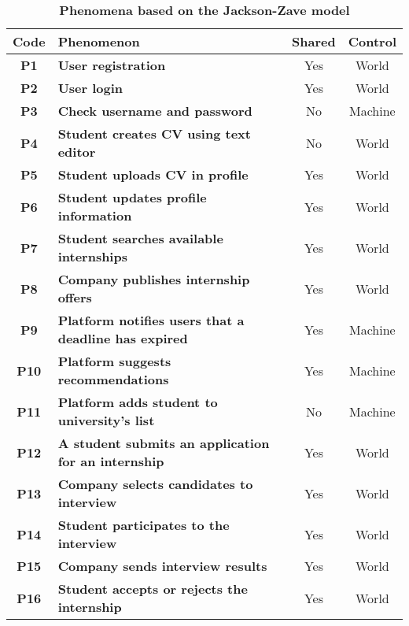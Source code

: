 \begin{table}[H]
    \caption*{\textbf{Phenomena based on the Jackson-Zave model}}
    \centering 
    \begin{tabular}{|c|p{24em}|c|c|}
    \hline
    \rowcolor{bluepoli!40} %
    \small\textbf{Code} & \small\textbf{Phenomenon} & \small\textbf{Shared} & \small\textbf{Control} \T\B \\
    \hline
    \small\textbf{P1} &\small \textbf{User registration} & Yes & World \T\B \\
    \small\textbf{P2} &\small \textbf{User login} & Yes & World \T\B\\
    \small\textbf{P3} &\small \textbf{Check username and password} & No & Machine \T\B\\
    \small\textbf{P4} &\small \textbf{Student creates CV using text editor} & No & World  \T\B \\
    \small\textbf{P5} &\small \textbf{Student uploads CV in profile} & Yes & World  \T\B \\
    \small\textbf{P6} &\small \textbf{Student updates profile information} & Yes & World  \T\B \\
    \small\textbf{P7} &\small \textbf{Student searches available internships} & Yes & World \T\B\\
    \small\textbf{P8} &\small \textbf{Company publishes internship offers} & Yes & World \T\B \\
    \small\textbf{P9} &\small \textbf{Platform notifies users that a deadline has expired} & Yes & Machine \B\\
    \small\textbf{P10} &\small \textbf{Platform suggests recommendations} & Yes & Machine \T\B \\
    \small\textbf{P11} &\small \textbf{Platform adds student to university's list} & No & Machine \T\B \\
    \small\textbf{P12} &\small \textbf{A student submits an application for an internship} & Yes & World \B\\
    \small\textbf{P13} &\small \textbf{Company selects candidates to interview} & Yes & World \T\B\\
    \small\textbf{P14} &\small \textbf{Student participates to the interview} & Yes & World \T\B \\
    \small\textbf{P15} &\small \textbf{Company sends interview results} & Yes & World \B\\
    \small\textbf{P16} &\small \textbf{Student accepts or rejects the internship} & Yes & World \T\B \\

\end{tabular}
\end{table}
